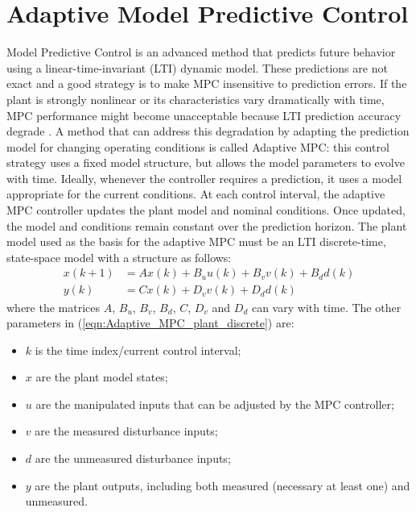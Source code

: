 \documentclass[conference,11pt]{IEEEtran}
\renewcommand{\vec}[1]{\ensuremath{\boldsymbol{\mathit{#1}}}}
\begin{document}
\section{Adaptive Model Predictive Control}
Model Predictive Control is an advanced method that predicts future behavior using a linear-time-invariant (LTI) dynamic model. These predictions are not exact and a good strategy is to make MPC insensitive to prediction errors. If the plant is strongly nonlinear or its characteristics vary dramatically with time, MPC performance might become unacceptable because LTI prediction accuracy degrade \cite{mpctoolbox}. A method that can address this degradation by adapting the prediction model for changing operating conditions is called Adaptive MPC: this control strategy uses a fixed model structure, but allows the model parameters to evolve with time. Ideally, whenever the controller requires a prediction, it uses a model appropriate for the current conditions. At each control interval, the adaptive MPC controller updates the plant model and nominal conditions. Once updated, the model and conditions remain constant over the prediction horizon. The plant model used as the basis for the adaptive MPC must be an LTI discrete-time, state-space model with a structure as follows:
\begin{equation}
\label{eqn:Adaptive_MPC_plant_discrete}
\begin{aligned}
\vec{x}(k+1)&=\vec{A}\vec{x}(k)+ \vec{B}_u \vec{u}(k)+\vec{B}_v \vec{v}(k)+\vec{B}_d \vec{d}(k)\\
\vec{y}(k)&=\vec{C}\vec{x}(k) + \vec{D}_v \vec{v}(k)+ \vec{D}_d \vec{d}(k)
\end{aligned}
\end{equation}
where the matrices \vec{A}, $\vec{B}_u$, $\vec{B}_v$, $\vec{B}_d$, \vec{C}, $\vec{D}_v$ and $\vec{D}_d$ can vary with time. The other parameters in (\ref{eqn:Adaptive_MPC_plant_discrete}) are:
\begin{itemize}
	\item $k$ is the time index/current control interval;
	\item \vec{x} are the plant model states;
	\item \vec{u} are the manipulated inputs that can be adjusted by the MPC controller;
	\item \vec{v} are the measured disturbance inputs;
	\item \vec{d} are the unmeasured disturbance inputs;
	\item \vec{y} are the plant outputs, including both measured (necessary at least one) and unmeasured.
\end{itemize}
\end{document}
